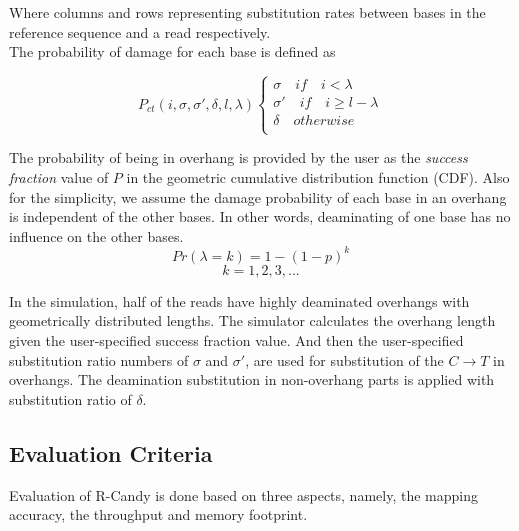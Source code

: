 \documentclass[11pt,a4paper]{report}
\begin{document}
Where columns and rows representing substitution rates between 
bases in the reference sequence and a read respectively.\\
The probability of damage for each base is defined as 

\[ P_{ct}(i, \sigma, \sigma', \delta, l, \lambda ) 
\begin{cases}
    \sigma  \quad if \quad i < \lambda  \\
    \sigma' \quad if \quad i \geq l-\lambda \\
    \delta \quad otherwise  \\
\end{cases}
\]

The probability of being in overhang is provided by the user as the 
\emph{success fraction} value of $P$ in the geometric cumulative distribution 
function (CDF). Also for the simplicity, we assume the damage probability 
of each base  in an overhang is independent of the other bases. In other 
words, deaminating of one base has no influence on the other bases.\\

$$Pr( \lambda = k ) = 1 - (1 - p)^{k}$$
$$ k = 1, 2, 3, ... $$

In the simulation, half of the reads have highly deaminated overhangs
with geometrically distributed lengths. The simulator calculates 
the overhang length given the user-specified success fraction value.
And then the user-specified substitution ratio numbers of $ \sigma $ 
and $\sigma' $,  are used for substitution of the $ C \rightarrow T$ 
in overhangs. The deamination substitution  in non-overhang parts is 
applied with substitution ratio of $\delta$.





\subsection{Evaluation Criteria} \label{Evaluation Criteria}

Evaluation of R-Candy is done based on three aspects, namely, 
the mapping accuracy, the throughput and memory footprint.
\end{document}
